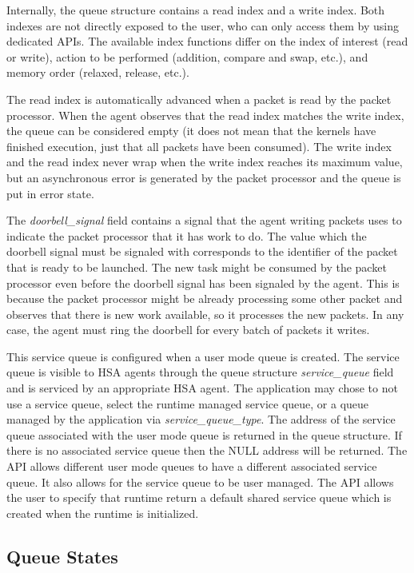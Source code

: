 \documentclass[final]{book}
\newcommand{\mariotodo}[1]{\todo[color=CarnationPink]{#1}}
\newcommand{\refarg}[1]{\textit{#1}}
\newcommand{\reffld}[1]{\textit{#1}}
\begin{document}
Internally, the queue structure contains a read index and a write index. Both
indexes are not directly exposed to the user, who can only access them by using
dedicated APIs.  The available index functions differ on the index of interest
(read or write), action to be performed (addition, compare and swap, etc.), and
memory order (relaxed, release, etc.).

The read index is automatically advanced when a packet is read by the packet
processor. When the agent observes that the read index matches the write index,
the queue can be considered empty (it does not mean that the kernels have
finished execution, just that all packets have been consumed). The write index
and the read index never wrap when the write index reaches its maximum value,
but an asynchronous error is generated by the packet processor and the queue is
put in error state.

The \reffld{doorbell_signal} field contains a signal that the agent writing
packets uses to indicate the packet processor that it has work to do. The value
which the doorbell signal must be signaled with corresponds to the identifier of
the packet that is ready to be launched.  The new task might be consumed by the
packet processor even before the doorbell signal has been signaled by the
agent. This is because the packet processor might be already processing some
other packet and observes that there is new work available, so it processes the
new packets. In any case, the agent must ring the doorbell for every batch of
packets it writes.

\mariotodo{clarify service queues}This service queue is configured when a user
mode queue is created. The service queue is visible to HSA agents through the
queue structure \reffld{service_queue} field and is serviced by an appropriate
HSA agent. The application may chose to not use a service queue, select the
runtime managed service queue, or a queue managed by the application via
\refarg{service_queue_type}. The address of the service queue associated with
the user mode queue is returned in the queue structure. If there is no
associated service queue then the NULL address will be returned. The API allows
different user mode queues to have a different associated service queue. It also
allows for the service queue to be user managed. The API allows the user to
specify that runtime return a default shared service queue which is created when
the runtime is initialized.

\hypertarget{queue-errors}{}\subsection{Queue States} \label{queue-errors}
\end{document}
